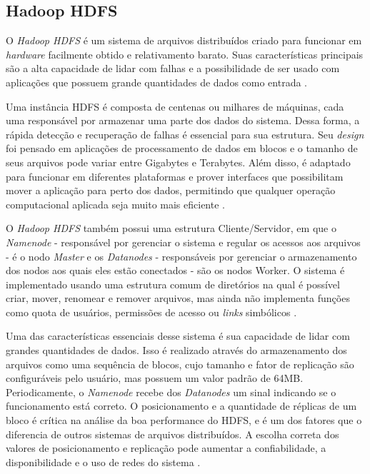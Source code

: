 \subsection{Hadoop HDFS}\label{ssec:hadoophdfs}

O \textit{Hadoop HDFS} é um sistema de arquivos distribuídos criado para funcionar em \textit{\gls{hardware}} facilmente obtido e relativamento barato. Suas características principais são a alta capacidade de lidar com falhas e a possibilidade de ser usado com aplicações que possuem grande quantidades de dados como entrada \cite{HDFSDesign20}.

Uma instância HDFS é composta de centenas ou milhares de máquinas, cada uma responsável por armazenar uma parte dos dados do sistema. Dessa forma, a rápida detecção e recuperação de falhas é essencial para sua estrutura. Seu \textit{design} foi pensado em aplicações de processamento de dados em blocos e o tamanho de seus arquivos pode variar entre Gigabytes e Terabytes. Além disso, é adaptado para funcionar em diferentes plataformas e prover interfaces que possibilitam mover a aplicação para perto dos dados, permitindo que qualquer operação computacional aplicada seja muito mais eficiente \cite{HDFSDesign20}.

O \textit{Hadoop HDFS} também possui uma estrutura Cliente/Servidor, em que o \textit{Namenode} - responsável por gerenciar o sistema e regular os acessos aos arquivos - é o nodo \textit{Master} e os \textit{Datanodes} - responsáveis por gerenciar o armazenamento dos nodos aos quais eles estão conectados - são os nodos Worker. O sistema é implementado usando uma estrutura comum de diretórios na qual é possível criar, mover, renomear e remover arquivos, mas ainda não implementa funções como quota de usuários, permissões de acesso ou \textit{links} simbólicos \cite{HDFSDesign20}.

Uma das características essenciais desse sistema é sua capacidade de lidar com grandes quantidades de dados. Isso é realizado através do armazenamento dos arquivos como uma sequência de blocos, cujo tamanho e fator de replicação são configuráveis pelo usuário, mas possuem um valor padrão de 64MB. Periodicamente, o \textit{Namenode} recebe dos \textit{Datanodes} um sinal indicando se o funcionamento está correto. O posicionamento e a quantidade de réplicas de um bloco é crítica na análise da boa performance do HDFS, e é um dos fatores que o diferencia de outros sistemas de arquivos distribuídos. A escolha correta dos valores de posicionamento e replicação pode aumentar a confiabilidade, a disponibilidade e o uso de redes do sistema \cite{HDFSDesign20}.


